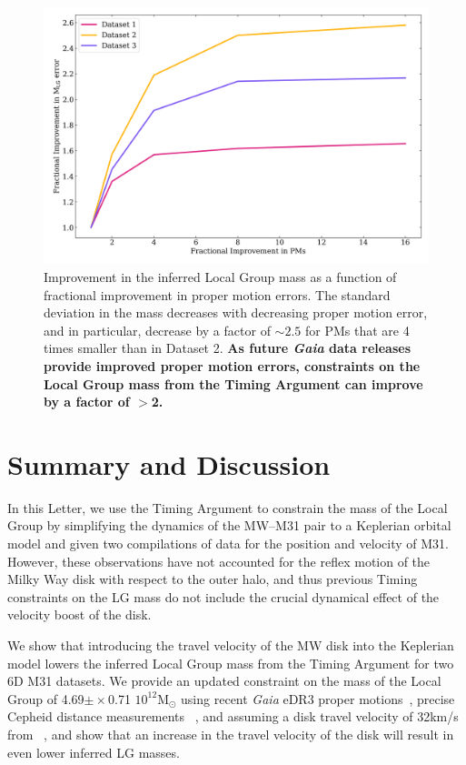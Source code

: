 \documentclass[twocolumn]{aastex631}
\newcommand{\msun}{\ensuremath{\textrm{M}_{\odot}}}
\begin{document}
\begin{figure}[htb]
    \centering
    \includegraphics[width=\columnwidth]{analyze-runs-deltaMvsPM.png}
    \caption{\label{fig:mvspm} Improvement in the inferred Local Group mass as a function of fractional improvement in proper motion errors. 
    The standard deviation in the mass decreases with decreasing proper motion 
    error, and in particular, decrease by a factor of $\sim2.5$ for PMs that are 
    4 times smaller than in Dataset 2. 
    \textbf{As future \textit{Gaia} data releases provide improved proper motion errors, constraints on the Local Group mass from the Timing Argument can 
    improve by a factor of $>$2.}
    }
\end{figure}

\section{Summary and Discussion}
\label{sec:discussion}
In this Letter, we use the Timing Argument to constrain the mass of the Local 
Group by 
simplifying the dynamics of the MW--M31 pair to a Keplerian orbital model and 
given two compilations of data for the position and velocity of M31. 
However, these observations have not accounted for the reflex motion of the 
Milky Way disk with respect to the outer halo, and thus previous Timing
constraints on 
the LG mass do not include the crucial dynamical effect of the velocity boost 
of the disk.

We show that introducing the travel velocity of the MW disk into the Keplerian 
model lowers the inferred Local Group mass from the Timing Argument for two 6D
M31 datasets. 
We provide an updated constraint on the mass of the Local Group of 
4.69$\pm\times$0.71 $10^{12}\msun$ using recent \textit{Gaia} eDR3 proper 
motions~\citep{Salomon2021}, precise Cepheid distance measurements
~\citep{Li2021}, and assuming a disk travel velocity of 32km/s from
~\cite{Petersen2021}, and show that an increase in the travel velocity of the 
disk will result in even lower inferred LG masses.
\end{document}
